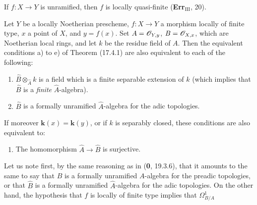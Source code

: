 \begin{corollary}[17.4.3]
\label{IV.17.4.3}
If $f:X\to Y$ is unramified, then $f$ is locally quasi-finite \textup{(\textbf{Err}$_{\mathrm{III}}$, 20)}.
\end{corollary}

\begin{proposition}[17.4.4]
\label{IV.17.4.4}
Let $Y$ be a \textup{locally Noetherian} prescheme, $f:X\to Y$ a morphism locally of finite type, $x$ a point of $X$, and $y=f(x)$. Set $A=\mathscr{O}_{Y,y}$, $B=\mathscr{O}_{X,x}$, which are Noetherian local rings, and let $k$ be the residue field of $A$. Then the equivalent conditions \textup{a)} to \textup{e)} of Theorem (17.4.1) are also equivalent to each of the following:
\begin{enumerate}
  \item[\textup{f)}] $\widehat{B}\otimes_{\widehat{A}}k$ is a field which is a finite separable extension of $k$ \textup{(which implies that $\widehat{B}$ is a \emph{finite} $\widehat{A}$-algebra)}.
  \item[\textup{f$'$)}] $\widehat{B}$ is a formally unramified $\widehat{A}$-algebra for the adic topologies.
\end{enumerate}
If moreover $\boldsymbol{k}(x)=\boldsymbol{k}(y)$, or if $k$ is separably closed, these conditions are also equivalent to:
\begin{enumerate}
  \item[\textup{f$''$)}] The homomorphism $\widehat{A}\to\widehat{B}$ is surjective.
\end{enumerate}
\end{proposition}

Let us note first, by the same reasoning as in (\textbf{0}, 19.3.6), that it amounts to the same to say that $B$ is a formally unramified $A$-algebra for the preadic topologies, or that $\widehat{B}$ is a formally unramified $\widehat{A}$-algebra for the adic topologies. On the other hand, the hypothesis that $f$ is locally of finite type implies that $\Omega^1_{B/A}$

